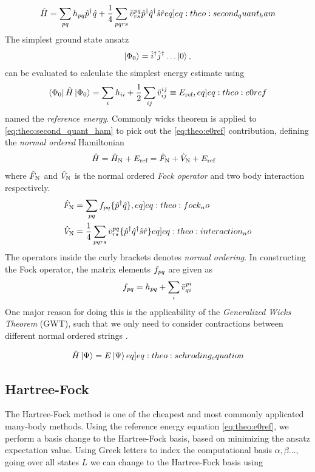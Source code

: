\begin{align}
    \ham = \sum_{pq} \hshort{p}{q}\crt{p}\ani{q} + \frac{1}{4} \sum_{pqrs} \elmASshort{pq}{rs}\crt{p}\crt{q}\ani{s}\ani{r} \label[eq]{eq:theo:second_quant_ham}
\end{align}
The simplest ground state ansatz
\begin{align*}
    \ket{\Phi_0} = \hat{i}^{\dagger}\hat{j}^{\dagger}\ldots \ket{0},
\end{align*}
can be evaluated to calculate the simplest energy estimate using  \citep{molinariNotesWickTheorem2017} 
\begin{align}
    \braansatz \ham \ketansatz = \sum_{i} \hshort{i}{i} + \frac{1}{2}\sum_{ij} \elmASshort{ij}{ij} \equiv \Eref, \label[eq]{eq:theo:e0ref}
\end{align}
named the \textit{reference energy}. Commonly wicks theorem is applied to \cref{eq:theo:second_quant_ham} to pick out the \cref{eq:theo:e0ref} contribution, defining the \textit{normal ordered} Hamiltonian
\begin{align*}
    \hat{H} &= \hat{H}_\text{N} + E_{\text{ref}} = \hat{F}_\text{N} + \hat{V}_\text{N} + E_{\text{ref}}
\end{align*}
where $\hat{F}_\text{N}$ and $\hat{V}_\text{N}$ is the normal ordered \textit{Fock operator} and two body interaction respectively.
\begin{align}
    \fockno &= \sum_{pq} \fshort{p}{q} \set{\crt{p} \ani{q}}, \label[eq]{eq:theo:fock_no} \\
    \interno &= \frac{1}{4}\sum_{pqrs} \elmASshort{pq}{rs} \set{\crt{p}\crt{q}\ani{s}\ani{r}} \label[eq]{eq:theo:interaction_no}
\end{align}
The operators inside the curly brackets denotes \textit{normal ordering}. In constructing the Fock operator, the matrix elements $f_{pq}$ are given as 
\begin{align*}
    f_{pq} = h_{pq} + \sum_i \bar{v}^{pi}_{qi}
\end{align*}
One major reason for doing this is the applicability of the \textit{Generalized Wicks Theorem} (GWT), such that we only need to consider contractions between different normal ordered strings \citep{ferialdiGeneralWickTheorem2021}.

\begin{align}
    \hat{H}\ket{\Psi} = E \ket{\Psi} \label[eq]{eq:theo:schroding_equation}
\end{align}

\subsection{Hartree-Fock}
The Hartree-Fock method is one of the cheapest and most commonly applicated many-body methods. Using the reference energy equation \cref{eq:theo:e0ref}, we perform a basis change to the Hartree-Fock basis, based on minimizing the ansatz expectation value. Using Greek letters to index the computational basis $\alpha, \beta \ldots$, going over all states $L$ we can change to the Hartree-Fock basis using

